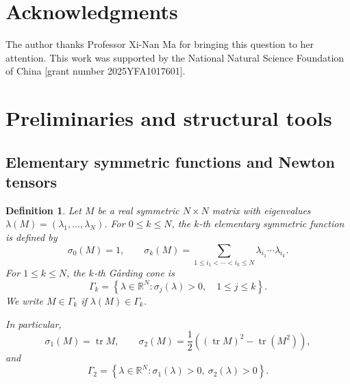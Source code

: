 \documentclass{article}
\newtheorem{definition}[theorem]{Definition}
\newcommand{\R}{\mathbb R}
\newcommand{\tr}{\operatorname{tr}}
\numberwithin{equation}{section}
\begin{document}
\section*{Acknowledgments}
The author thanks Professor Xi-Nan Ma for bringing this question to her attention. This work was supported by the National Natural Science Foundation of China [grant number 2025YFA1017601].

\section{Preliminaries and structural tools}\label{sec:prelim}

\subsection{Elementary symmetric functions and Newton tensors}

\begin{definition}
\label{def:sigma-garding}
Let $M$ be a real symmetric $N\times N$ matrix with eigenvalues
$\lambda(M)=(\lambda_1,\ldots,\lambda_N)$. For $0\le k\le N$, the $k$-th
elementary symmetric function is defined by
\begin{equation}\label{eq:sigmak}
\sigma_0(M)=1,
\qquad
\sigma_k(M)
=
\sum_{1\le i_1<\cdots<i_k\le N}
\lambda_{i_1}\cdots\lambda_{i_k}.
\end{equation}
For $1\le k\le N$, the $k$-th G\aa rding cone is
\begin{equation}\label{eq:Gammak}
\Gamma_k
=
\left\{
\lambda\in\R^N:
\sigma_j(\lambda)>0,\quad 1\le j\le k
\right\}.
\end{equation}
We write $M\in\Gamma_k$ if $\lambda(M)\in\Gamma_k$.

In particular,
\begin{equation}\label{eq:sigma2trace}
\sigma_1(M)=\tr M,
\qquad
\sigma_2(M)
=
\frac12\left((\tr M)^2-\tr(M^2)\right),
\end{equation}
and
\begin{equation}\label{eq:Gamma2}
\Gamma_2
=
\left\{
\lambda\in\R^N:
\sigma_1(\lambda)>0,\ 
\sigma_2(\lambda)>0
\right\}.
\end{equation}
\end{definition}
\end{document}
